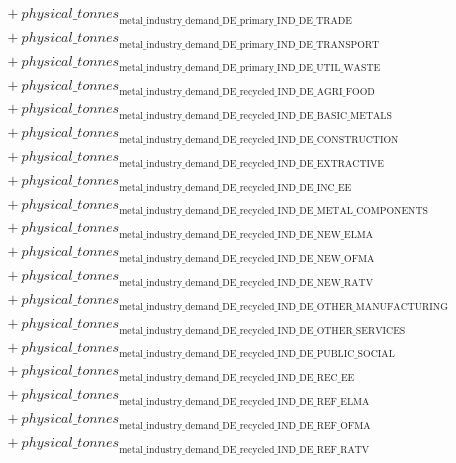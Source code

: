 \documentclass[11pt]{article}
\begin{document}
\begin{align*}
&\quad {}+ {physical\_tonnes}_{\text{metal\_industry\_demand\_DE\_primary\_IND\_DE\_TRADE}}\\
&\quad {}+ {physical\_tonnes}_{\text{metal\_industry\_demand\_DE\_primary\_IND\_DE\_TRANSPORT}}\\
&\quad {}+ {physical\_tonnes}_{\text{metal\_industry\_demand\_DE\_primary\_IND\_DE\_UTIL\_WASTE}}\\
&\quad {}+ {physical\_tonnes}_{\text{metal\_industry\_demand\_DE\_recycled\_IND\_DE\_AGRI\_FOOD}}\\
&\quad {}+ {physical\_tonnes}_{\text{metal\_industry\_demand\_DE\_recycled\_IND\_DE\_BASIC\_METALS}}\\
&\quad {}+ {physical\_tonnes}_{\text{metal\_industry\_demand\_DE\_recycled\_IND\_DE\_CONSTRUCTION}}\\
&\quad {}+ {physical\_tonnes}_{\text{metal\_industry\_demand\_DE\_recycled\_IND\_DE\_EXTRACTIVE}}\\
&\quad {}+ {physical\_tonnes}_{\text{metal\_industry\_demand\_DE\_recycled\_IND\_DE\_INC\_EE}}\\
&\quad {}+ {physical\_tonnes}_{\text{metal\_industry\_demand\_DE\_recycled\_IND\_DE\_METAL\_COMPONENTS}}\\
&\quad {}+ {physical\_tonnes}_{\text{metal\_industry\_demand\_DE\_recycled\_IND\_DE\_NEW\_ELMA}}\\
&\quad {}+ {physical\_tonnes}_{\text{metal\_industry\_demand\_DE\_recycled\_IND\_DE\_NEW\_OFMA}}\\
&\quad {}+ {physical\_tonnes}_{\text{metal\_industry\_demand\_DE\_recycled\_IND\_DE\_NEW\_RATV}}\\
&\quad {}+ {physical\_tonnes}_{\text{metal\_industry\_demand\_DE\_recycled\_IND\_DE\_OTHER\_MANUFACTURING}}\\
&\quad {}+ {physical\_tonnes}_{\text{metal\_industry\_demand\_DE\_recycled\_IND\_DE\_OTHER\_SERVICES}}\\
&\quad {}+ {physical\_tonnes}_{\text{metal\_industry\_demand\_DE\_recycled\_IND\_DE\_PUBLIC\_SOCIAL}}\\
&\quad {}+ {physical\_tonnes}_{\text{metal\_industry\_demand\_DE\_recycled\_IND\_DE\_REC\_EE}}\\
&\quad {}+ {physical\_tonnes}_{\text{metal\_industry\_demand\_DE\_recycled\_IND\_DE\_REF\_ELMA}}\\
&\quad {}+ {physical\_tonnes}_{\text{metal\_industry\_demand\_DE\_recycled\_IND\_DE\_REF\_OFMA}}\\
&\quad {}+ {physical\_tonnes}_{\text{metal\_industry\_demand\_DE\_recycled\_IND\_DE\_REF\_RATV}}\\

\end{align*}
\end{document}
